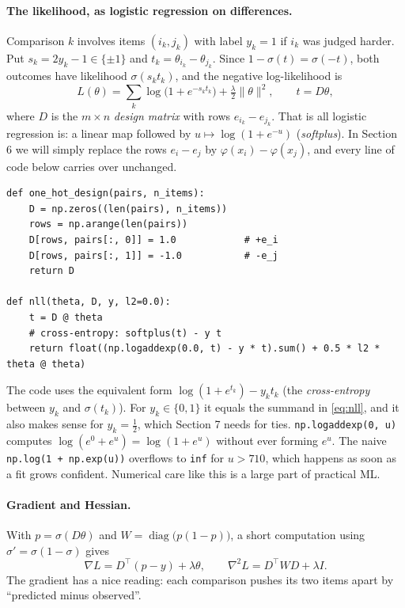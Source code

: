\documentclass[11pt]{article}
\theoremstyle{definition}
\theoremstyle{plain}
\theoremstyle{remark}
\newcommand{\code}[1]{\texttt{#1}}
\renewcommand{\_}{\oldunderscore\allowbreak}
\newcommand{\file}[1]{\textcolor{blue!50!black}{\texttt{#1}}}
\newcommand{\codefrom}[1]{\par\smallskip\noindent{\footnotesize\textbf{From} \file{#1}}}
\begin{document}
\paragraph{The likelihood, as logistic regression on differences.}
Comparison $k$ involves items $(i_k,j_k)$ with label $y_k=1$ if $i_k$ was judged harder. Put $s_k=2y_k-1\in\{\pm1\}$
and $t_k=\theta_{i_k}-\theta_{j_k}$. Since $1-\sigma(t)=\sigma(-t)$, both outcomes have likelihood $\sigma(s_kt_k)$, and the
negative log-likelihood is
\begin{equation}\label{eq:nll}
  L(\theta)=\sum_k\log\bigl(1+e^{-s_kt_k}\bigr)+\tfrac\lambda2\|\theta\|^2,\qquad t=D\theta,
\end{equation}
where $D$ is the $m\times n$ \emph{design matrix} with rows $e_{i_k}-e_{j_k}$. That is all logistic regression is: a
linear map followed by $u\mapsto\log(1+e^{-u})$ (\emph{softplus}). In Section 6 we will simply replace the rows
$e_i-e_j$ by $\varphi(x_i)-\varphi(x_j)$, and every line of code below carries over unchanged.

\codefrom{src/calcdiff/models/bt.py}
\begin{lstlisting}
def one_hot_design(pairs, n_items):
    D = np.zeros((len(pairs), n_items))
    rows = np.arange(len(pairs))
    D[rows, pairs[:, 0]] = 1.0            # +e_i
    D[rows, pairs[:, 1]] = -1.0           # -e_j
    return D

def nll(theta, D, y, l2=0.0):
    t = D @ theta
    # cross-entropy: softplus(t) - y t
    return float((np.logaddexp(0.0, t) - y * t).sum() + 0.5 * l2 * theta @ theta)
\end{lstlisting}
The code uses the equivalent form $\log(1+e^{t_k})-y_kt_k$ (the \emph{cross-entropy} between $y_k$ and $\sigma(t_k)$). For
$y_k\in\{0,1\}$ it equals the summand in \eqref{eq:nll}, and it also makes sense for $y_k=\frac12$, which Section 7 needs for ties.
\code{np.logaddexp(0, u)} computes $\log(e^0+e^u)=\log(1+e^u)$ without ever forming $e^u$. The naive
\code{np.log(1 + np.exp(u))} overflows to \code{inf} for $u>710$, which happens as soon as a fit grows confident.
Numerical care like this is a large part of practical ML.

\paragraph{Gradient and Hessian.}
With $p=\sigma(D\theta)$ and $W=\operatorname{diag}\bigl(p(1-p)\bigr)$, a short computation using $\sigma'=\sigma(1-\sigma)$ gives
\[
  \nabla L=D^\top(p-y)+\lambda\theta,\qquad \nabla^2L=D^\top WD+\lambda I.
\]
The gradient has a nice reading: each comparison pushes its two items apart by ``predicted minus observed''.
\end{document}

